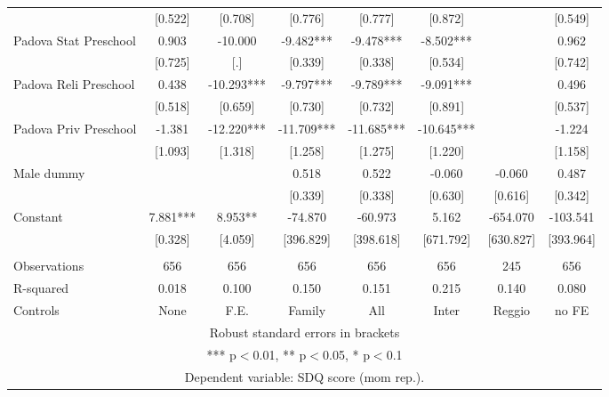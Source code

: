 \begin{tabular}{lccccccc}
 & [0.522] & [0.708] & [0.776] & [0.777] & [0.872] &  & [0.549] \\
Padova Stat Preschool & 0.903 & -10.000 & -9.482*** & -9.478*** & -8.502*** &  & 0.962 \\
 & [0.725] & [.] & [0.339] & [0.338] & [0.534] &  & [0.742] \\
Padova Reli Preschool & 0.438 & -10.293*** & -9.797*** & -9.789*** & -9.091*** &  & 0.496 \\
 & [0.518] & [0.659] & [0.730] & [0.732] & [0.891] &  & [0.537] \\
Padova Priv Preschool & -1.381 & -12.220*** & -11.709*** & -11.685*** & -10.645*** &  & -1.224 \\
 & [1.093] & [1.318] & [1.258] & [1.275] & [1.220] &  & [1.158] \\
Male dummy &  &  & 0.518 & 0.522 & -0.060 & -0.060 & 0.487 \\
 &  &  & [0.339] & [0.338] & [0.630] & [0.616] & [0.342] \\
Constant & 7.881*** & 8.953** & -74.870 & -60.973 & 5.162 & -654.070 & -103.541 \\
 & [0.328] & [4.059] & [396.829] & [398.618] & [671.792] & [630.827] & [393.964] \\
 &  &  &  &  &  &  &  \\
Observations & 656 & 656 & 656 & 656 & 656 & 245 & 656 \\
R-squared & 0.018 & 0.100 & 0.150 & 0.151 & 0.215 & 0.140 & 0.080 \\
 Controls & None & F.E. & Family & All & Inter & Reggio & no FE \\ \hline
\multicolumn{8}{c}{ Robust standard errors in brackets} \\
\multicolumn{8}{c}{ *** p$<$0.01, ** p$<$0.05, * p$<$0.1} \\
\multicolumn{8}{c}{ Dependent variable: SDQ score (mom rep.).} \\
\end{tabular}
